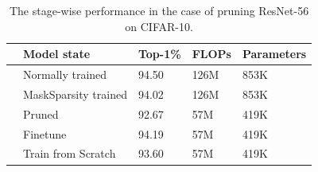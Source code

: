 \documentclass[review]{cvpr}
\begin{document}

 
  

\begin{table}[ht]

	\caption{The stage-wise performance in the case of  pruning ResNet-56 on CIFAR-10.}
	\small
	\setlength{\tabcolsep}{0.5em}
	\begin{center}
		\begin{tabular}{lllll}
			\toprule
		&Model state               &Top-1\%           &FLOPs          &Parameters \\
		\midrule
		&Normally trained      &94.50            &126M      &853K  \\
		&MaskSparsity trained        &94.02             &126M      &853K  \\
		
		&Pruned      &92.67             &57M     &419K  \\
		&Finetune       &94.19             &57M    &419K \\
		\hline
		&Train from Scratch   &93.60            &57M  &419K  \\
		\bottomrule
			
		\end{tabular}
	\end{center} 
	\label{Finetune_scratch_cifar10}
\end{table}
\end{document}
